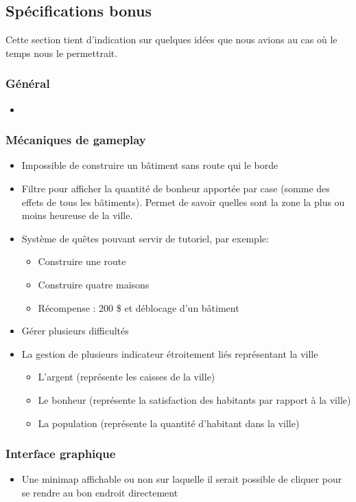 \documentclass[a4paper,10pt,openany,oneside]{report}
\begin{document}
\subsection{Spécifications \textcolor{bonus}{bonus}}
Cette section tient d'indication sur quelques idées que nous avions au cas où le temps nous le permettrait.

\subsubsection{Général}
\begin{itemize}
\item
\end{itemize}

\subsubsection{Mécaniques de gameplay}
\begin{itemize}
	\item Impossible de construire un bâtiment sans route qui le borde
	\item Filtre pour afficher la quantité de bonheur apportée par case (somme des effets de tous les bâtiments). Permet de savoir quelles sont la zone la plus ou moins heureuse de la ville.
	\item Système de quêtes pouvant servir de tutoriel, par exemple:
	\begin{itemize}
		\item Construire une route
		\item Construire quatre maisons
		\item Récompense : 200 \$ et déblocage d'un bâtiment
	\end{itemize}
	\item Gérer plusieurs difficultés
	\item La gestion de plusieurs indicateur étroitement liés représentant la ville
	\begin{itemize}
		\item L'argent (représente les caisses de la ville)
		\item Le bonheur (représente la satisfaction des habitants par rapport à la ville)
		\item La population (représente la quantité d'habitant dans la ville)
	\end{itemize}
\end{itemize}

\subsubsection{Interface graphique}
\begin{itemize}

\item Une minimap affichable ou non sur laquelle il serait possible de cliquer pour se rendre au bon endroit directement
\end{itemize}
\end{document}
